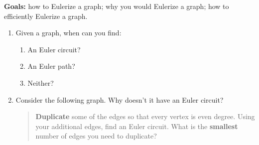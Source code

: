 \documentclass[12pt]{article}
\renewcommand{\emph}[1]{\textsf{\textbf{#1}}}
\newcommand{\be}{\begin{enumerate}}
\newcommand{\ee}{\end{enumerate}}
\begin{document}
\emph{Goals:} how to Eulerize a graph; why you would Eulerize a graph; how to efficiently Eulerize a graph.
\begin{enumerate}
\item Given a graph, when can you find:
\be
\item An Euler circuit?
\vfill
\item An Euler path?
\vfill
\item Neither?
\vfill
\ee
\item Consider the following graph. Why doesn't it have an Euler circuit?

\vfill

\begin{quote}
\emph{Duplicate} some of the edges so that every vertex is even degree. Using your additional edges, find an Euler circuit. What is the \emph{smallest} number of edges you need to duplicate?
\end{quote}

%
%
%


\end{enumerate}
\end{document}
